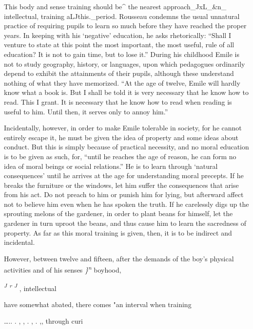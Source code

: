 \documentclass[
]{book}
\begin{document}
This body and sense training should be\^{} the nearest approach\_JxL\_\&n\_ intellectual, training aLJthis.\_period. Rousseau condemns the usual unnatural practice of requiring pupils to learn so much before they have reached the proper years. In keeping with his `negative' education, he asks rhetorically: ``Shall I venture to state at this point the most important, the most useful, rule of all education? It is not to gain time, but to lose it.'' During his childhood Emile is not to study geography, history, or languages, upon which pedagogues ordinarily depend to exhibit the attainments of their pupils, although these understand nothing of what they have memorized. ``At the age of twelve, Emile will hardly know what a book is. But I shall be told it is very necessary that he know how to read. This I grant. It is necessary that he know how to read when reading is useful to him. Until then, it serves only to annoy him.''

Incidentally, however, in order to make Emile tolerable in society, for he cannot entirely escape it, he must be given the idea of property and some ideas about conduct. But this is simply because of practical necessity, and no moral education is to be given as such, for, ``until he reaches the age of reason, he can form no idea of moral beings or social relations.'' He is to learn through `natural consequences' until he arrives at the age for understanding moral precepts. If he breaks the furniture or the windows, let him suffer the consequences that arise from his act. Do not preach to him or punish him for lying, but afterward affect not to believe him even when\protect\hypertarget{ch19.xmlux5cux23para.272.1.0.box.139.243.1048.304.q.60}{}{ he has spoken the truth. If he carelessly digs up the sprouting melons of the gardener, in order to plant beans for himself, let the gardener in turn uproot the beans, and thus cause him to learn the sacredness of property. As far as this moral training is given, then, it is to be indirect and incidental.}

However, between twelve and fifteen, after the demands of the boy's physical activities and of his senses \emph{\}\textsuperscript{n}} boyhood,

\emph{\textsuperscript{J} \textsuperscript{r} \textsuperscript{J}} , intellectual

have somewhat abated, there comes "an interval when training

\ldots.. . , , . , . ,, through curi
\end{document}

